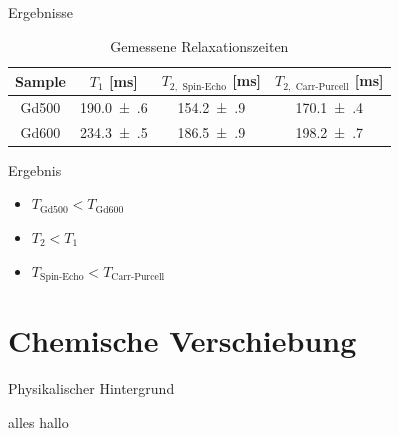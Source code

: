 \begin{frame}{Ergebnisse}
	\begin{table}
	\centering
	\begin{tabular}{cccc}
	\toprule
	Sample & $T_1$ [ms] & $T_{2,\text{ Spin-Echo}}$ [ms] & $T_{2,\text{ Carr-Purcell}}$ [ms]\\
	\midrule
	Gd500 & \num{190.0(6)} & \num{154.2(9)} & \num{170.1(4)}\\
	Gd600 & \num{234.3(5)} & \num{186.5(9)} & \num{198.2(7)}\\
	\bottomrule
	\end{tabular}
	\caption{Gemessene Relaxationszeiten}
	\end{table}
	\begin{block}{Ergebnis}
	\begin{itemize}
	\item $T_\text{Gd500} < T_\text{Gd600}$
	\item $T_2 < T_1$
	\item $T_\text{Spin-Echo} < T_\text{Carr-Purcell}$
	\end{itemize}
	\end{block}
\end{frame}




\section{Chemische Verschiebung}
\begin{frame}{Physikalischer Hintergrund}
\begin{exampleblock}{alles}
hallo
\end{exampleblock}
\end{frame}





